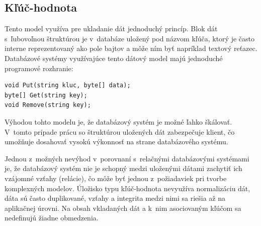 \documentclass[11pt,twoside,a4paper]{book}
\begin{document}
% 
% 
% 
% 
% 
% 
% 
% 

\subsection{Kľúč-hodnota}


Tento model využíva pre ukladanie dát jednoduchý princíp. Blok dát s~ľubovoľnou štruktúrou je v~databáze uložený pod názvom kľúča, ktorý je často interne reprezentovaný ako pole bajtov a môže ním byť napríklad textový reťazec. Databázové systémy využívajúce tento dátový model majú jednoduché programové rozhranie:

\begin{verbatim}
void Put(string kluc, byte[] data);
byte[] Get(string key);
void Remove(string key);
\end{verbatim}


Výhodou tohto modelu je, že databázový systém je možné ľahko škálovať. V~tomto prípade prácu so štruktúrou uložených dát zabezpečuje klient, čo umožňuje dosahovať vysokú výkonnosť na strane databázového systému.

Jednou z~možných nevýhod v~porovnaní s~relačnými databázovými systémami je, že databázový systém nie je schopný medzi uloženými dátami zachytiť ich vzájomné vzťahy (relácie), čo môže byť jednou z~požiadaviek pri tvorbe komplexných modelov. Úložisko typu kľúč-hodnota nevyužíva normalizáciu dát, dáta sú často duplikované, vzťahy a integrita medzi nimi sa riešia až na aplikačnej úrovni. Na obsah vkladaných dát a k~nim asociovaným kľúčom sa nedefinujú žiadne obmedzenia.
\end{document}

